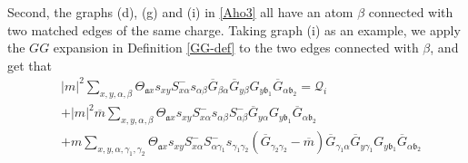 \documentclass{article}
\newcommand{\1}{\mathds{1}}
\numberwithin{equation}{section}
\newcommand{\al}{\alpha}
\newcommand{\fa}{{\mathfrak a}}
\newcommand{\fb}{{\mathfrak b}}
\renewcommand{\cal}{\mathcal}
\theoremstyle{plain} %
\theoremstyle{remark}
\newcommand{\cor}{\color{red}}
\begin{document}
Second, the graphs (d), (g) and (i) in \eqref{Aho3} all have an atom $\beta$ connected with two matched edges of the same charge. Taking graph (i) as an example, we apply the $GG$ expansion in Definition \ref{GG-def} to the two edges connected with $\beta$, and get that 
\begin{align*}
& 	|m|^2 \sum_{x,y,\al,\beta} \Theta_{\fa x} s_{xy}  S^-_{x\al} s_{\al\beta}\overline G_{\beta\al} \overline G_{y\beta} G_{y\fb_1}\overline G_{\al\fb_2}=\cal Q_i\\
& + |m|^2 \overline m\sum_{x,y,\al,\beta} \Theta_{\fa x} s_{xy}  S^-_{x\al} s_{\al\beta}S^-_{\al\beta}\overline G_{y\al} G_{y\fb_1}\overline G_{\al\fb_2} \tag{i1}\\
&  + m\sum_{x,y,\al, \gamma_1,\gamma_2} \Theta_{\fa x} s_{xy}  S^-_{x\al} S^-_{\al \gamma_1}s_{\gamma_1\gamma_2} (\overline G_{\gamma_2\gamma_2}-\overline m ) \overline G_{\gamma_1\al} \overline G_{y \gamma_1} G_{y\fb_1}\overline G_{\al \fb_2} \tag{i2}\\

\end{align*}
\end{document}
